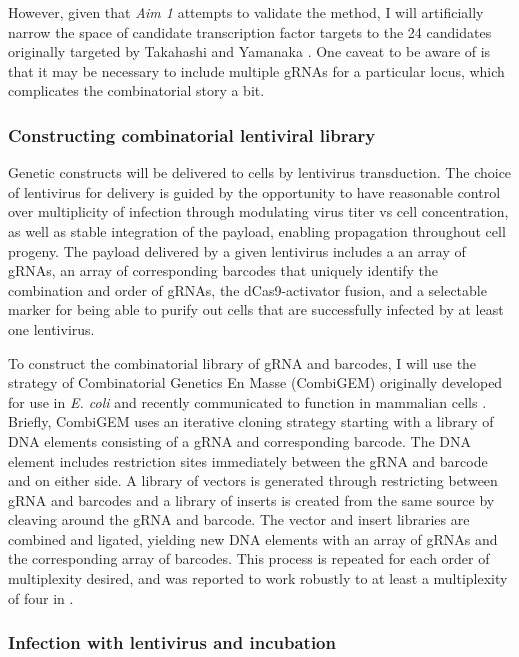 \documentclass[10pt]{article}
\begin{document}
However, given that \textit{Aim 1} attempts to validate the method, I will artificially narrow the space of candidate transcription factor targets to the 24 candidates originally targeted by Takahashi and Yamanaka \cite{takahashi2006induction}. One caveat to be aware of is that it may be necessary to include multiple gRNAs for a particular locus, which complicates the combinatorial story a bit.

\subsubsection{Constructing combinatorial lentiviral library}

Genetic constructs will be delivered to cells by lentivirus transduction. The choice of lentivirus for delivery is guided by the opportunity to have reasonable control over multiplicity of infection through modulating virus titer vs cell concentration, as well as stable integration of the payload, enabling propagation throughout cell progeny. The payload delivered by a given lentivirus includes a an array of gRNAs, an array of corresponding barcodes that uniquely identify the combination and order of gRNAs, the dCas9-activator fusion, and a selectable marker for being able to purify out cells that are successfully infected by at least one lentivirus.

To construct the combinatorial library of gRNA and barcodes, I will use the strategy of Combinatorial Genetics En Masse (CombiGEM) \cite{cheng2014enhanced} originally developed for use in \textit{E. coli} and recently communicated to function in mammalian cells \cite{lu2015combigem}. Briefly, CombiGEM uses an iterative cloning strategy starting with a library of DNA elements consisting of a gRNA and corresponding barcode. The DNA element includes restriction sites immediately between the gRNA and barcode and on either side. A library of vectors is generated through restricting between gRNA and barcodes and a library of inserts is created from the same source by cleaving around the gRNA and barcode. The vector and insert libraries are combined and ligated, yielding new DNA elements with an array of gRNAs and the corresponding array of barcodes. This process is repeated for each order of multiplexity desired, and was reported to work robustly to at least a multiplexity of four in \cite{cheng2014enhanced}.

\subsubsection{Infection with lentivirus and incubation}
\end{document}
